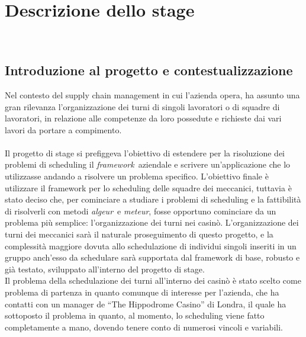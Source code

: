 
\renewcommand\theadalign{cb}
\renewcommand\theadfont{\bfseries}
\renewcommand\theadgape{\Gape[4pt]}
\renewcommand{\arraystretch}{2}

\chapter{Descrizione dello stage}
\label{cap:descrizione-stage}

\\

\section{Introduzione al progetto e contestualizzazione}
Nel contesto del supply chain management in cui l’azienda opera, ha assunto una gran rilevanza l’organizzazione dei turni di singoli lavoratori o di squadre di lavoratori, in relazione alle competenze da loro possedute e richieste dai vari lavori da portare a compimento. \\ \\
Il progetto di stage si prefiggeva l'obiettivo di estendere per la risoluzione dei problemi di scheduling il \emph{\gls{framework}}\glsfirstoccur\ aziendale e scrivere un'applicazione che lo utilizzasse andando a risolvere un problema specifico. L'obiettivo finale è utilizzare il framework per lo scheduling delle squadre dei meccanici, tuttavia è stato deciso che, per cominciare a studiare i problemi di scheduling e la fattibilità di risolverli con metodi \emph{\gls{algeur}}\glsfirstoccur\ e \emph{\gls{meteur}}\glsfirstoccur, fosse opportuno cominciare da un problema più semplice: l'organizzazione dei turni nei casinò. L'organizzazione dei turni dei meccanici sarà il naturale proseguimento di questo progetto, e la complessità maggiore dovuta allo schedulazione di individui singoli inseriti in un gruppo anch'esso da schedulare sarà supportata dal framework di base, robusto e già testato, sviluppato all'interno del progetto di stage. \\ 
Il problema della schedulazione dei turni all'interno dei casinò è stato scelto come problema di partenza in quanto comunque di interesse per l'azienda, che ha contatti con un manager de ``The Hippodrome Casino'' di Londra, il quale ha sottoposto il problema in quanto, al momento, lo scheduling viene fatto completamente a mano, dovendo tenere conto di numerosi vincoli e variabili. \\

